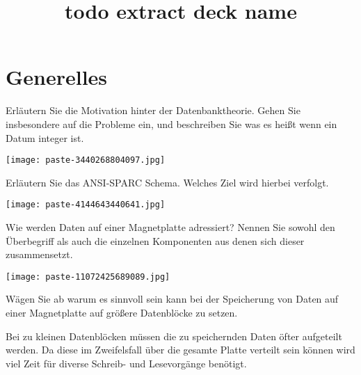 \documentclass{article}
\title{todo extract deck name}
\begin{document}
\section{Generelles}
\begin{tcolorbox}[colback=white!10!white,colframe=lightgray!75!black,
  savelowerto=\jobname_ex.tex]

\begin{center}
 Erläutern Sie die Motivation hinter der Datenbanktheorie. Gehen Sie insbesondere auf die 
Probleme
 ein, und beschreiben Sie was es heißt wenn ein Datum 
integer
ist. 

\end{center}

\tcblower

\justifying
\texttt{[image: paste-3440268804097.jpg]}
\end{tcolorbox}
\begin{tcolorbox}[colback=white!10!white,colframe=lightgray!75!black,
  savelowerto=\jobname_ex.tex]

\begin{center}
 Erläutern Sie das 
ANSI-SPARC
Schema. Welches Ziel wird hierbei verfolgt. 

\end{center}

\tcblower

\justifying
\texttt{[image: paste-4144643440641.jpg]}
\end{tcolorbox}
\begin{tcolorbox}[colback=white!10!white,colframe=lightgray!75!black,
  savelowerto=\jobname_ex.tex]

\begin{center}
 Wie werden Daten auf einer Magnetplatte 
adressiert?
Nennen Sie sowohl den Überbegriff als auch die einzelnen Komponenten aus denen sich dieser zusammensetzt. 

\end{center}

\tcblower

\justifying
\texttt{[image: paste-11072425689089.jpg]}
\end{tcolorbox}
\begin{tcolorbox}[colback=white!10!white,colframe=lightgray!75!black,
  savelowerto=\jobname_ex.tex]

\begin{center}
 Wägen Sie ab warum es sinnvoll sein kann bei der Speicherung von Daten auf einer Magnetplatte auf größere Datenblöcke zu setzen. 

\end{center}

\tcblower

\justifying
Bei zu kleinen Datenblöcken müssen die zu speichernden Daten öfter aufgeteilt werden. Da diese im Zweifelsfall über die gesamte Platte verteilt sein können wird viel Zeit für diverse Schreib- und Lesevorgänge benötigt.

\end{tcolorbox}
\end{document}
